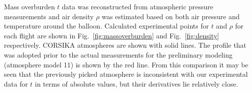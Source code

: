 \documentclass[preprint,5p,times]{elsarticle}
\begin{document}



Mass overburden $t$ data was reconstructed from atmospheric pressure measurements and air density $\rho$ was estimated based on both air pressure and temperature around the balloon. Calculated experimental points for $t$ and $\rho$ for each flight are shown in Fig.~\ref{fig:massoverburden} and Fig.~\ref{fig:density} respectively. CORSIKA atmospheres are shown with solid lines. The profile that was adopted prior to the actual measurements for the preliminary modeling (atmosphere model 11) is shown by the red line. From this comparison it may be seen that the previously picked atmosphere is inconsistent with our experimental data for $t$ in terms of absolute values, but their derivatives lie relatively close. %
\end{document}
